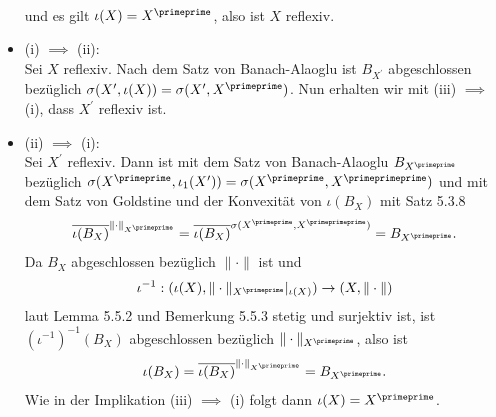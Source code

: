 \begin{solution}
\begin{itemize}
\begin{align*}
  \end{align*}
  und es gilt $\iota(X) = X^{\primeprime}$, also ist $X$ reflexiv.
  \item (i) $\implies$ (ii): \\
  Sei $X$ reflexiv. Nach dem Satz von Banach-Alaoglu ist $B_{X^{\prime}}$ abgeschlossen
  bezüglich $\sigma(X^{\prime}, \iota(X)) = \sigma(X^{\prime},X^{\primeprime})$.
  Nun erhalten wir mit (iii) $\implies$ (i), dass $X^{\prime}$ reflexiv ist.
  \item (ii) $\implies$ (i): \\
  Sei $X^{\prime}$ reflexiv. Dann ist mit dem Satz von Banach-Alaoglu $B_{X^{\primeprime}}$
  bezüglich $\sigma(X^{\primeprime}, \iota_1(X^{\prime})) = \sigma(X^{\primeprime}, X^{\primeprimeprime})$
  und mit dem Satz von Goldstine und der Konvexität von $\iota(B_X)$ mit Satz 5.3.8
  \begin{align*}
    \overline{\iota(B_X)}^{\|\cdot\|_{X^{\primeprime}}}
    = \overline{\iota(B_X)}^{\sigma(X^{\primeprime},X^{\primeprimeprime})} = B_{X^{\primeprime}}.
  \end{align*}
  Da $B_X$ abgeschlossen bezüglich $\|\cdot\|$ ist und
  \begin{align*}
    \iota^{-1}: (\iota(X), \|\cdot\|_{X^{\primeprime}}|_{\iota(X)}) \to (X,\|\cdot\|)
  \end{align*}
  laut Lemma 5.5.2 und Bemerkung 5.5.3
  stetig und surjektiv ist, ist $(\iota^{-1})^{-1}(B_X)$ abgeschlossen bezüglich $\|\cdot\|_{X^{\primeprime}}$,
  also ist
  \begin{align*}
    \iota(B_X) = \overline{\iota(B_X)}^{\|\cdot\|_{X^{\primeprime}}} = B_{X^{\primeprime}}.
  \end{align*}
  Wie in der Implikation (iii) $\implies$ (i) folgt dann $\iota(X) = X^{\primeprime}$.
 \end{itemize}
\end{solution}
